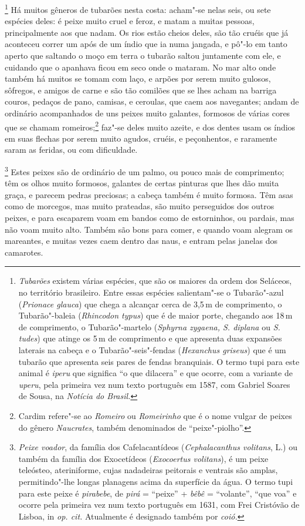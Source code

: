 \begin{linenumbers}
\footnote{ \textit{Tubarões} existem várias
espécies, que são os maiores da ordem dos Seláceos, no território
brasileiro. Entre essas espécies salientam"-se o Tubarão"-azul
(\textit{Prionace glauca}) que chega a alcançar cerca de 3,5\,m de
comprimento, o Tubarão"-baleia (\textit{Rhincodon typus}) que é de
maior porte, chegando aos 18\,m de comprimento, o Tubarão"-martelo
(\textit{Sphyrna zygaena, S. diplana} ou \textit{S. tudes}) que
atinge os 5\,m de comprimento e que apresenta duas expansões laterais
na cabeça e o Tubarão"-seis"-fendas (\textit{Hexanchus griseus}) que é
um tubarão que apresenta seis pares de fendas branquiais. O termo tupi
para este animal é \textit{iperu} que significa ``o que dilacera'' e
que ocorre, com a variante de \textit{uperu}, pela primeira vez num
texto português em 1587, com Gabriel Soares de Sousa, na
\textit{Notícia do Brasil.}} Há muitos gêneros de tubarões
nesta costa: acham"-se nelas seis, ou sete espécies deles: é peixe muito
cruel e feroz, e matam a muitas pessoas, principalmente aos que nadam.
Os rios estão cheios deles, são tão cruéis que já aconteceu correr um
após de um índio que ia numa jangada, e pô"-lo em tanto aperto que
saltando o moço em terra o tubarão saltou juntamente com ele, e
cuidando que o apanhava ficou em seco onde o mataram. No mar alto onde
também há muitos se tomam com laço, e arpões por serem muito gulosos,
sôfregos, e amigos de carne e são tão comilões que se lhes acham na
barriga couros, pedaços de pano, camisas, e ceroulas, que caem aos
navegantes; andam de ordinário acompanhados de uns peixes muito
galantes, formosos de várias cores que se chamam romeiros;\footnote{ Cardim 
refere"-se ao \textit{Romeiro} ou \textit{Romeirinho} que é o
nome vulgar de peixes do gênero \textit{Naucrates}, também denominados
de ``peixe"-piolho''.} faz"-se deles muito azeite, e dos dentes usam os
índios em suas flechas por serem muito agudos, cruéis, e peçonhentos, e
raramente saram as feridas, ou com dificuldade.

\footnote{ \textit{Peixe voador}, da família dos
Cafelacantídeos (\textit{Cephalacanthus volitans}, L.) ou também da
família dos Exocetídeos (\textit{Exocoertus volitans}), é um peixe
teleósteo, ateriniforme, cujas nadadeiras peitorais e ventrais são
amplas, permitindo"-lhe longas planagens acima da superfície da água. O
termo tupi para este peixe é \textit{pirabebe}, de \textit{pirá} = 
``peixe'' + \textit{bêbê} = ``volante'', ``que voa'' e ocorre pela primeira
vez num texto português em 1631, com Frei Cristóvão de Lisboa, in
\textit{op. cit.} Atualmente é designado também por
\textit{coió.}} Estes peixes são de ordinário de um palmo,
ou pouco mais de comprimento; têm os olhos muito formosos, galantes de
certas pinturas que lhes dão muita graça, e parecem pedras preciosas; a
cabeça também é muito formosa. Têm asas como de morcegos, mas muito
prateadas, são muito perseguidos dos outros peixes, e para escaparem
voam em bandos como de estorninhos, ou pardais, mas não voam muito
alto. Também são bons para comer, e quando voam alegram os mareantes, e
muitas vezes caem dentro das naus, e entram pelas janelas dos
camarotes.


\end{linenumbers}
